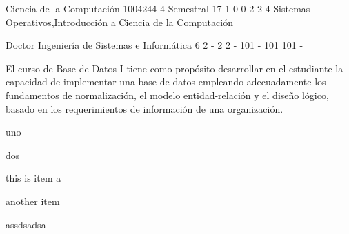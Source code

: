\documentclass[a4paper,8pt]{article}
\begin{document}

\sylabusHeader

\academicaTable
{Ciencia de la Computación} %
{1004244} %
{4} %
{Semestral} %
{17} %
{1} %
{0} %
{0} %
{2}  %
{2} %
{4} %
{Sistemas Operativos,Introducción a Ciencia de la Computación} %

\administrativaTable
{Doctor} %
{Ingeniería de Sistemas e Informática} %
{6} %
{2} %
{-} %
{2} %
{2} %
{-} %
{101} %
{-} %
{101} %
{101} %
{-} %


\begin{fundamentacion}
El curso de Base de Datos I tiene como propósito desarrollar en el estudiante la capacidad de implementar una base de datos empleando adecuadamente los fundamentos de normalización, el modelo entidad-relación y el diseño lógico, basado en los requerimientos de información de una organización.
\end{fundamentacion}

\begin{sumilla}
\item uno
\item dos
\end{sumilla}

\begin{competenciasAsignatura}
\item this is item a
\item another item
\item assdsadsa
\end{competenciasAsignatura}

\begin{contenidos}



\end{contenidos}
\end{document}
